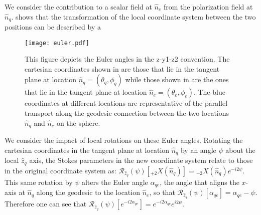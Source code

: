 We consider the contribution to a scalar field at $\hat n_e$ from the polarization field at $\hat n_q$.  shows that the transformation of the local coordinate system between the two positions can be described by a 
%
\begin{figure}%
\centering
\texttt{[image: euler.pdf]}
\caption{This figure depicts the Euler angles in the z-y1-z2 convention. The cartesian coordinates shown in  are those that lie in the tangent plane at location $\hat{n}_q = (\theta_q, \phi_q)$ while those shown in  are the ones that lie in the tangent plane at location $\hat{n}_e = (\theta_e, \phi_e)$. The blue coordinates at different locations are representative of the parallel transport along the geodesic connection between the two locations $\hat{n}_q$ and $\hat{n}_e$ on the sphere.}
\label{fig:euler_angles}
\end{figure}
%

We consider the impact of local rotations on these Euler angles.
Rotating the cartesian coordinates in the tangent plane at location $\hat{n}_q$ by an angle $\psi$ about the local $\hat{z}_q$ axis, the Stokes parameters in the new coordinate system relate to those in the original coordinate system as:
$\mathcal{R}_{\hat{z}_q}(\psi)[{}_{+2}X(\hat{n}_q)] =  {}_{+2}X(\hat{n}_q) e^{-i2\psi} $.
This same rotation by $\psi$ alters the Euler angle $\alpha_{qe}$, the angle that aligns the $x$-axis at $\hat{n}_q$ along the geodesic to the location $\hat{n}_e$, so that $\mathcal{R}_{\hat{z}_q}(\psi)[\alpha_{qe}] = \alpha_{qe} - \psi$.  Therefore one can see that $\mathcal{R}_{\hat{z}_q}(\psi)[e^{-i2\alpha_{qe}}] =  e^{-i2\alpha_{qe}} e^{i2\psi}$.

